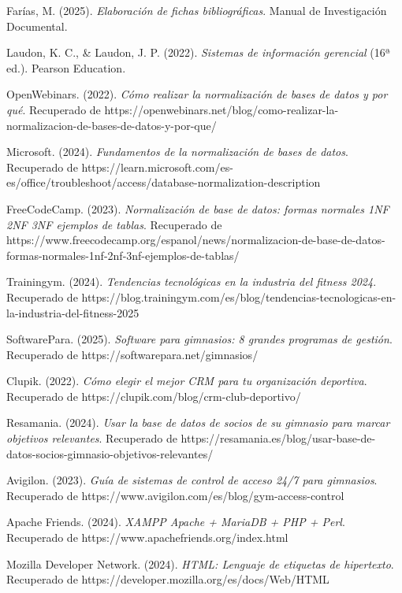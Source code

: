 \documentclass[12pt, letterpaper]{article}
\begin{document}
\begin{thebibliography}{99}
Farías, M. (2025). \textit{Elaboración de fichas bibliográficas}. Manual de Investigación Documental.

Laudon, K. C., \& Laudon, J. P. (2022). \textit{Sistemas de información gerencial} (16ª ed.). Pearson Education.

OpenWebinars. (2022). \textit{Cómo realizar la normalización de bases de datos y por qué}. Recuperado de https://openwebinars.net/blog/como-realizar-la-normalizacion-de-bases-de-datos-y-por-que/

Microsoft. (2024). \textit{Fundamentos de la normalización de bases de datos}. Recuperado de https://learn.microsoft.com/es-es/office/troubleshoot/access/database-normalization-description

FreeCodeCamp. (2023). \textit{Normalización de base de datos: formas normales 1NF 2NF 3NF ejemplos de tablas}. Recuperado de https://www.freecodecamp.org/espanol/news/normalizacion-de-base-de-datos-formas-normales-1nf-2nf-3nf-ejemplos-de-tablas/

Trainingym. (2024). \textit{Tendencias tecnológicas en la industria del fitness 2024}. Recuperado de https://blog.trainingym.com/es/blog/tendencias-tecnologicas-en-la-industria-del-fitness-2025

SoftwarePara. (2025). \textit{Software para gimnasios: 8 grandes programas de gestión}. Recuperado de https://softwarepara.net/gimnasios/

Clupik. (2022). \textit{Cómo elegir el mejor CRM para tu organización deportiva}. Recuperado de https://clupik.com/blog/crm-club-deportivo/

Resamania. (2024). \textit{Usar la base de datos de socios de su gimnasio para marcar objetivos relevantes}. Recuperado de https://resamania.es/blog/usar-base-de-datos-socios-gimnasio-objetivos-relevantes/

Avigilon. (2023). \textit{Guía de sistemas de control de acceso 24/7 para gimnasios}. Recuperado de https://www.avigilon.com/es/blog/gym-access-control

Apache Friends. (2024). \textit{XAMPP Apache + MariaDB + PHP + Perl}. Recuperado de https://www.apachefriends.org/index.html

Mozilla Developer Network. (2024). \textit{HTML: Lenguaje de etiquetas de hipertexto}. Recuperado de https://developer.mozilla.org/es/docs/Web/HTML


\end{thebibliography}
\end{document}
